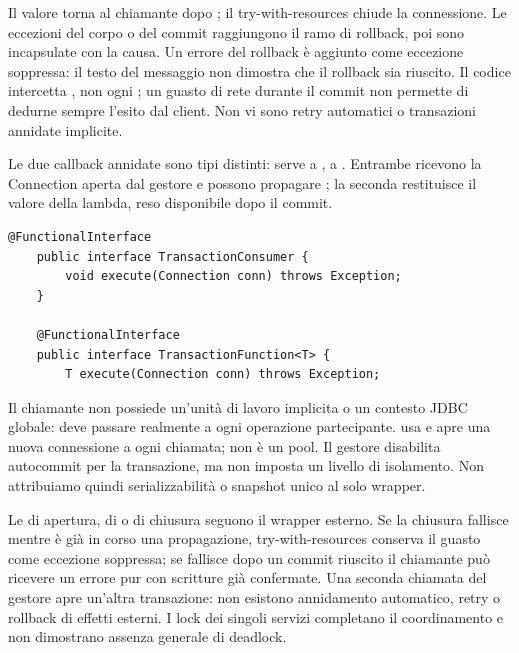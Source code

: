 Il valore torna al chiamante dopo ; il try-with-resources
chiude la connessione. Le eccezioni del corpo o del commit raggiungono
il ramo di rollback, poi sono incapsulate con la causa. Un errore del
rollback è aggiunto come eccezione soppressa: il testo del messaggio
non dimostra che il rollback sia riuscito. Il codice intercetta
, non ogni ; un guasto di rete durante il
commit non permette di dedurne sempre l'esito dal client. Non vi sono
retry automatici o transazioni annidate implicite.

{\raggedright
Le due callback annidate sono tipi distinti: 
serve a , 
a . Entrambe ricevono la Connection
aperta dal gestore e possono propagare ; la seconda
restituisce il valore della lambda, reso disponibile dopo il commit.\par}


\noindent\begin{minipage}{\linewidth}
\begin{lstlisting}[firstnumber=53,gobble=4,caption={Due callback distinte con Connection e risultato.},label=lst:callback]
    @FunctionalInterface
    public interface TransactionConsumer {
        void execute(Connection conn) throws Exception;
    }

    @FunctionalInterface
    public interface TransactionFunction<T> {
        T execute(Connection conn) throws Exception;
\end{lstlisting}
\end{minipage}

Il chiamante non possiede un'unità di lavoro implicita o un contesto JDBC
globale: deve passare realmente  a ogni operazione partecipante.
 usa  e apre una
nuova connessione a ogni chiamata; non è un pool. Il gestore disabilita
autocommit per la transazione, ma non imposta un livello di isolamento.
Non attribuiamo quindi serializzabilità o snapshot unico al solo wrapper.

Le  di apertura, di  o di chiusura
seguono il wrapper esterno. Se la chiusura fallisce mentre è già in corso
una propagazione, try-with-resources conserva il guasto come eccezione
soppressa; se fallisce dopo un commit riuscito il chiamante può ricevere
un errore pur con scritture già confermate. Una seconda chiamata del
gestore apre un'altra transazione: non esistono annidamento automatico,
retry o rollback di effetti esterni. I lock dei singoli servizi completano
il coordinamento e non dimostrano assenza generale di deadlock.

